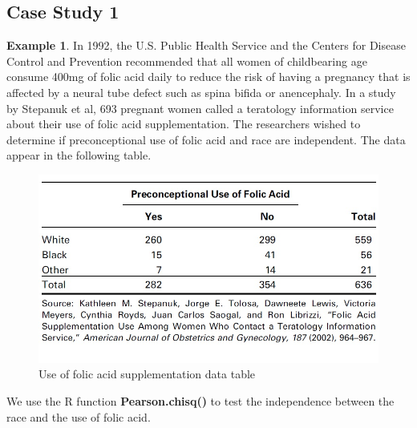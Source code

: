 \documentclass[
]{book}
\begin{document}
\hypertarget{case-study-1-1}{%
\subsection{Case Study 1}\label{case-study-1-1}}

\textbf{Example 1}. In 1992, the U.S. Public Health Service and the Centers for Disease Control and Prevention recommended that all women of childbearing age consume 400mg of folic acid daily to reduce the risk of having a pregnancy that is affected by a neural tube defect such as spina bifida or anencephaly. In a study by Stepanuk et al, 693 pregnant women called a teratology information service about their use of folic acid supplementation. The researchers wished to determine if preconceptional use of folic acid and race are independent. The data appear in the following table.

\begin{figure}

{\centering \includegraphics[width=0.8\linewidth]{img12/w12-casestusy01} 

}

\caption{Use of folic acid supplementation data table}\label{fig:unnamed-chunk-199}
\end{figure}

We use the R function \textbf{Pearson.chisq()} to test the independence between the race and the use of folic acid.
\end{document}
